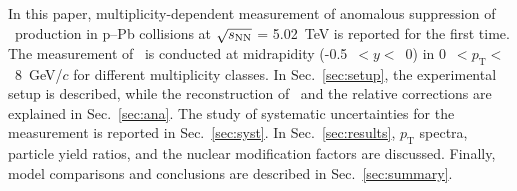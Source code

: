 
In this paper, multiplicity-dependent measurement of anomalous suppression of \fzero~production in p--Pb collisions at $\sqrt{s_{\rm NN}}$ = 5.02~TeV is reported for the first time. The measurement of \fzero~is conducted at midrapidity (-0.5~$<y<$~0) in 0~$<p_{\mathrm{T}}<$~8~GeV/$c$ for different multiplicity classes. In Sec.~\ref{sec:setup}, the experimental setup is described, while the reconstruction of \fzero\ and the relative corrections are explained in Sec.~\ref{sec:ana}. The study of systematic uncertainties for the measurement is reported in Sec.~\ref{sec:syst}. In Sec.~\ref{sec:results}, $p_{\mathrm{T}}$ spectra, particle yield ratios, and the nuclear modification factors are discussed. Finally, model comparisons and conclusions are described in Sec.~\ref{sec:summary}.

\label{sec:intro}



